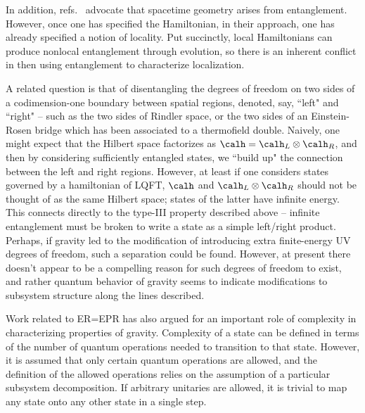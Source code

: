 In addition, refs.~ advocate that spacetime geometry arises from entanglement.  However, once one has specified the Hamiltonian, in their approach, one has already specified a notion of locality.  Put  succinctly, local Hamiltonians can produce nonlocal entanglement through evolution, so there is an inherent conflict in then using entanglement to characterize localization.  

A related question is that of disentangling the degrees of freedom on two sides of a codimension-one boundary between spatial regions, denoted, say, ``left" and ``right"  -- such as the two sides of Rindler space, or the two sides of an Einstein-Rosen bridge which has been associated to a thermofield double.  Naively, one might expect that the Hilbert space factorizes as $\calh= \calh_L\otimes \calh_R$, and then by considering sufficiently entangled states, we ``build up" the connection between the left and right regions.  However, at least if one considers states governed by a hamiltonian of LQFT, $\calh$  and $ \calh_L\otimes \calh_R$ should not be thought of as the same Hilbert space; states of the latter have infinite energy.  This connects directly to the type-III property described above -- infinite entanglement must be broken to write a state as a simple left/right product.  Perhaps, if gravity led to the modification of introducing extra finite-energy UV degrees of freedom, such a separation could be found.  However, at present there doesn't appear to be a compelling reason for such degrees of freedom to exist, and rather quantum behavior of gravity seems to indicate modifications to subsystem structure along the lines described.

Work related to ER=EPR has also argued for an important role of complexity in characterizing properties of gravity. Complexity of a state can be defined in terms of the number of quantum operations needed to transition to that state.  However, it is assumed that only certain quantum operations are allowed, and the definition of the allowed operations relies on the assumption of a particular subsystem decomposition.  If arbitrary unitaries are allowed, it is trivial to map any state onto any other state in a single step.

